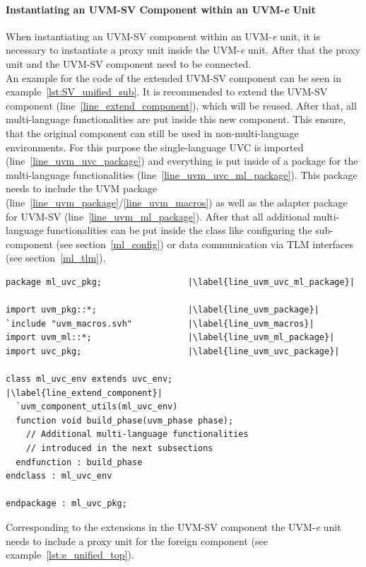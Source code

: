 \paragraph{Instantiating an UVM-SV Component within an UVM-\textit{e} Unit}
\label{sv_inside_e}
When instantiating an UVM-SV component within an UVM-\textit{e} unit,
it is necessary to instantiate a proxy unit inside the UVM-\textit{e} unit. After that the
proxy unit and the UVM-SV component need to be connected. \\
An example for the code of the extended UVM-SV component can be seen in
example~\ref{lst:SV_unified_sub}.
It is recommended to extend the UVM-SV component
(line~\ref{line_extend_component}), which will
be reused. After that, all multi-language functionalities are put inside this new
component. This ensure, that the original component can still be used in
non-multi-language environments. For this purpose the single-language UVC is imported (line~\ref{line_uvm_uvc_package}) and everything is put inside of a package for the multi-language functionalities (line~\ref{line_uvm_uvc_ml_package}). This package needs to include the UVM
package (line~\ref{line_uvm_package}/\ref{line_uvm_macros}) as well as the adapter
package for UVM-SV (line~\ref{line_uvm_ml_package}).
After that all additional multi-language functionalities can be put inside the
class like configuring the sub-component (see section~\ref{ml_config}) or data
communication via TLM interfaces (see section~\ref{ml_tlm}).
\medskip
{}
\begin{lstlisting}[frame=htrbl, caption={SystemVerilog: extended multi-language component}, label={lst:SV_unified_sub}]
package ml_uvc_pkg;					|\label{line_uvm_uvc_ml_package}|

import uvm_pkg::*;					|\label{line_uvm_package}|
`include "uvm_macros.svh"			|\label{line_uvm_macros}|
import uvm_ml::*;					|\label{line_uvm_ml_package}|
import uvc_pkg;						|\label{line_uvm_uvc_package}|

class ml_uvc_env extends uvc_env;			|\label{line_extend_component}|
  `uvm_component_utils(ml_uvc_env)
  function void build_phase(uvm_phase phase);
    // Additional multi-language functionalities
    // introduced in the next subsections
  endfunction : build_phase
endclass : ml_uvc_env

endpackage : ml_uvc_pkg;
\end{lstlisting}
\medskip
Corresponding to the extensions in the UVM-SV component the UVM-\textit{e}
unit needs to include a proxy unit for the foreign component (see example~\ref{lst:e_unified_top}).
